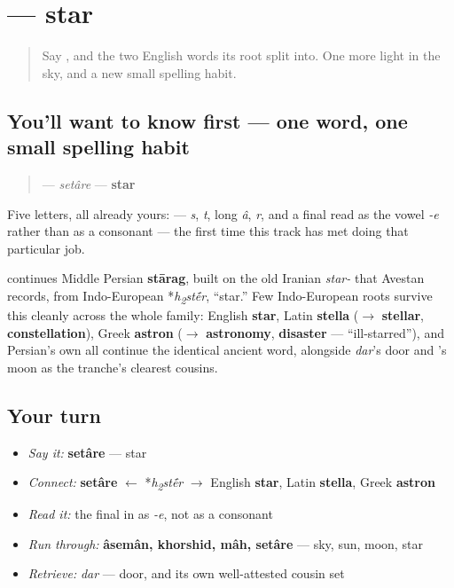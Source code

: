 \section[\texorpdfstring{\fa{ستاره} (setâre)}{ستاره (setâre)}]{ — star}

\label{lesson:FA-C13-setare}



\begin{quote}
Say \textbf{}, and the two English words its root split into. One more light in the sky, and a new small spelling habit.
\end{quote}

\subsection*{You'll want to know first — one word, one small spelling habit}
\begin{quote}
\textbf{} — \emph{setâre} — \textbf{star}
\end{quote}

Five letters, all already yours: \textbf{    } — \emph{s}, \emph{t}, long \emph{â}, \emph{r}, and a final \textbf{} read as the vowel \emph{-e} rather than as a consonant — the first time this track has met \textbf{} doing that particular job.

\begin{cousinweb}
\textbf{} continues Middle Persian \textbf{stārag}, built on the old Iranian \emph{star-} that Avestan records, from Indo-European *\emph{h\textsubscript{2}st\'{\={e}}r}, \textquotedblleft{}star.\textquotedblright{} Few Indo-European roots survive this cleanly across the whole family: English \textbf{star}, Latin \textbf{stella} ($\to$ \textbf{stellar}, \textbf{constellation}), Greek \textbf{astron} ($\to$ \textbf{astronomy}, \textbf{disaster} — \textquotedblleft{}ill-starred\textquotedblright{}), and Persian's own \textbf{} all continue the identical ancient word, alongside \emph{dar}'s door and \textbf{}'s moon as the tranche's clearest cousins.
\end{cousinweb}

\subsection*{Your turn}
\begin{itemize}
\raggedright
  \item \emph{Say it:} \textbf{setâre} — star
  \item \emph{Connect:} \textbf{setâre} $\leftarrow$ *\emph{h\textsubscript{2}st\'{\={e}}r} $\to$ English \textbf{star}, Latin \textbf{stella}, Greek \textbf{astron}
  \item \emph{Read it:} the final \textbf{} in \textbf{} as \emph{-e}, not as a consonant
  \item \emph{Run through:} \textbf{âsemân, khorshid, mâh, setâre} — sky, sun, moon, star
  \item \emph{Retrieve:} \emph{dar} — door, and its own well-attested cousin set
\end{itemize}

